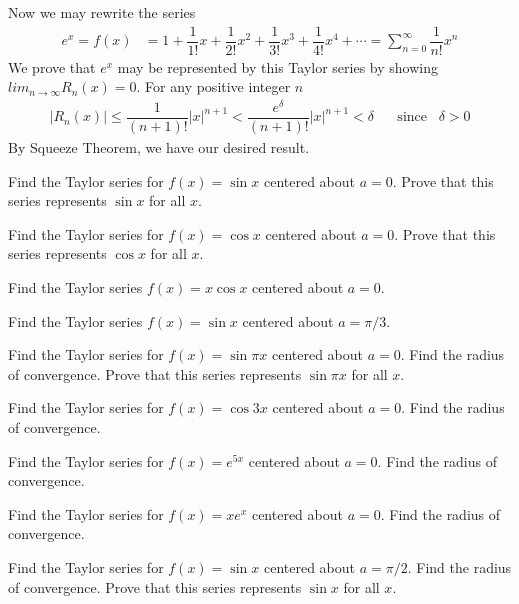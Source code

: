 \begin{example}
Now we may rewrite the series
\begin{align*}
    e^{x} = f(x) &= 1 + \dfrac{1}{1!}x + \dfrac{1}{2!}x^{2} + \dfrac{1}{3!}x^{3} + \dfrac{1}{4!}x^{4} + \cdots = \sum_{n=0}^{\infty} \dfrac{1}{n!}x^{n}
\end{align*}
We prove that $e^{x}$ may be represented by this Taylor series by showing $lim_{n \longrightarrow \infty}R_{n}(x) = 0$. For any positive integer $n$
\begin{align*}
    \lvert R_{n}(x) \rvert \leq \dfrac{1}{(n+1)!} \lvert x \rvert^{n+1} < \dfrac{e^{\delta}}{(n+1)!} \lvert x \rvert^{n+1} < \delta \hspace{20pt} \text{since} \hspace{10pt} \delta > 0
\end{align*}
By Squeeze Theorem, we have our desired result.
\end{example}

\begin{exercise}
Find the Taylor series for $f(x) = \sin x$ centered about $a = 0$. Prove that this series represents $\sin x$ for all $x$.
\end{exercise}

\begin{exercise}
Find the Taylor series for $f(x) = \cos x$ centered about $a = 0$. Prove that this series represents $\cos x$ for all $x$.
\end{exercise}

\begin{exercise}
Find the Taylor series $f(x) = x \cos x$ centered about $a = 0$.
\end{exercise}

\begin{exercise}
Find the Taylor series $f(x) = \sin x$ centered about $a = \pi/3$.
\end{exercise}

\begin{exercise}
Find the Taylor series for $f(x) = \sin \pi x$ centered about $a = 0$. Find the radius of convergence. Prove that this series represents $\sin \pi x$ for all $x$.
\end{exercise}

\begin{exercise}
Find the Taylor series for $f(x) = \cos 3x$ centered about $a = 0$. Find the radius of convergence.
\end{exercise}

\begin{exercise}
Find the Taylor series for $f(x) = e^{5x}$ centered about $a = 0$. Find the radius of convergence.
\end{exercise}

\begin{exercise}
Find the Taylor series for $f(x) = xe^{x}$ centered about $a = 0$. Find the radius of convergence.
\end{exercise}

\begin{exercise}
Find the Taylor series for $f(x) = \sin x$ centered about $a = \pi/2$. Find the radius of convergence. Prove that this series represents $\sin x$ for all $x$.
\end{exercise}